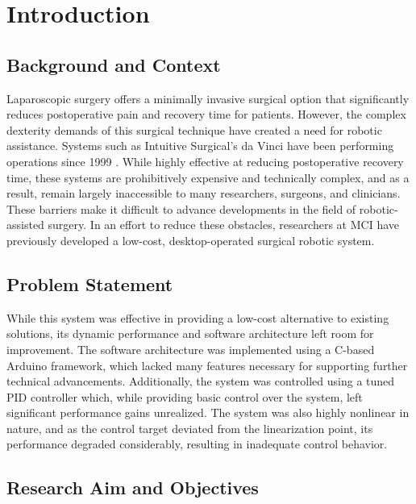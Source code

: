 \chapter{Introduction}


\section{Background and Context}
\label{section:background}

Laparoscopic surgery offers a minimally invasive surgical option that significantly reduces postoperative pain and recovery time for patients. However, the complex dexterity demands of this surgical technique have created a need for robotic assistance. Systems such as Intuitive Surgical’s da Vinci have been performing operations since 1999 \cite{Lanfranco2004RoboticSurgery}. While highly effective at reducing postoperative recovery time, these systems are prohibitively expensive and technically complex, and as a result, remain largely inaccessible to many researchers, surgeons, and clinicians. These barriers make it difficult to advance developments in the field of robotic-assisted surgery. In an effort to reduce these obstacles, researchers at MCI have previously developed a low-cost, desktop-operated surgical robotic system.

\section{Problem Statement}
\label{section:problem_statement}

While this system was effective in providing a low-cost alternative to existing solutions, its dynamic performance and software architecture left room for improvement. The software architecture was implemented using a C-based Arduino framework, which lacked many features necessary for supporting further technical advancements. Additionally, the system was controlled using a tuned PID controller which, while providing basic control over the system, left significant performance gains unrealized. The system was also highly nonlinear in nature, and as the control target deviated from the linearization point, its performance degraded considerably, resulting in inadequate control behavior.

\section{Research Aim and Objectives}
\label{section:objectives}

